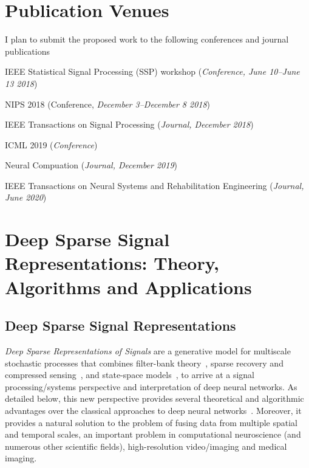 \documentclass[12pt]{article}
\renewenvironment{itemize}{
  \begin{list}{}{
    \setlength{\itemsep}{0.25em}
    \setlength{\parskip}{0pt}
    \setlength{\parsep}{0.25em}
  }
}{
  \end{list}
}
\begin{document}
\section*{Publication Venues}

I plan to submit the proposed work to the following conferences and journal publications

\begin{itemize}
	\item IEEE Statistical Signal Processing (SSP) workshop (\emph{Conference, June 10--June 13 2018})
	\item NIPS 2018 (Conference, \emph{December 3--December 8 2018})
	\item IEEE Transactions on Signal Processing (\emph{Journal, December 2018})
	\item ICML 2019 (\emph{Conference})
	\item Neural Compuation (\emph{Journal, December 2019})
	\item IEEE Transactions on Neural Systems and Rehabilitation Engineering (\emph{Journal, June 2020})
\end{itemize}



\section*{Deep Sparse Signal Representations: Theory, Algorithms and Applications}


\subsection*{Deep Sparse Signal Representations}

\emph{Deep Sparse Representations of Signals} are a generative model for multiscale stochastic processes that combines filter-bank theory~\cite{fliege1994multirate,strang1996wavelets,daubechies1992ten}, sparse recovery and compressed sensing~\cite{donoho2006compressed,candes2008introduction}, and state-space models~\cite{Ba:12,ba2013b}, to arrive at a signal processing/systems perspective and interpretation of deep neural networks. As detailed below, this new perspective provides several theoretical and algorithmic advantages over the classical approaches to deep neural networks~\cite{lecun2015deep}. Moreover, it provides a natural solution to the problem of fusing data from multiple spatial and temporal scales, an important problem in computational neuroscience (and numerous other scientific fields), high-resolution video/imaging and medical imaging.
\end{document}
